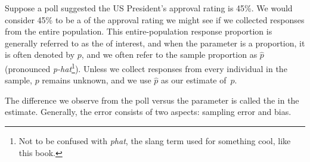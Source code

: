 Suppose a poll suggested the US President's approval
rating is 45\%.
We would consider 45\% to be a
 of the approval
rating we might see if we collected responses from the
entire population.
This entire-population response proportion is
generally referred to as the 
of interest,
and when the parameter is a proportion,
it is often denoted by $p$,
and we often refer to the sample proportion as $\hat{p}$
(pronounced \emph{p-hat}\footnote{Not to be confused with
  \emph{phat}, the slang term used for something cool,
  like this book.}).
Unless we collect responses from every individual in the sample,
$p$ remains unknown, and we use $\hat{p}$ as our estimate of~$p$.

The difference we observe from the poll versus
the parameter is called the  in the estimate.
Generally, the error consists of two aspects:
sampling error and bias.


%
%

